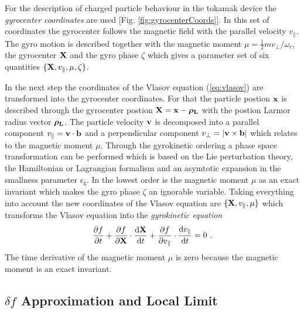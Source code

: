 For the description of charged particle behaviour in the tokamak device the \textit{gyrocenter coordinates} are used [Fig. \ref{fig:gyrocenterCoords}]. In this set of coordinates the gyrocenter follows the magnetic field with the parallel velocity $v_{\parallel}$. The gyro motion is described together with the magnetic moment $\mu = \frac{1}{2}mv_\perp/\omega_\mathrm{c}$, the gyrocenter $\boldsymbol{\mathbf{X}}$ and the gyro phase $\zeta$ which gives a parameter set of six quantities $\{\boldsymbol{\mathbf{X}}, v_{\parallel}, \mu, \zeta\}$.


In the next step the coordinates of the Vlasov equation (\ref{eq:vlasov}) are transformed into the gyrocenter coordinates. For that the particle postion $\boldsymbol{\mathbf{x}}$ is described through the gyrocenter postion $\boldsymbol{\mathbf{X}} = \boldsymbol{\mathbf{x}} - \boldsymbol{\mathbf{\rho_\mathrm{L}}}$ with the postion Larmor radius vector $\boldsymbol{\mathbf{\rho_\mathrm{L}}}$. The particle velocity $\boldsymbol{\mathbf{v}}$ is decomposed into a parallel component $v_\parallel = \boldsymbol{\mathbf{v}} \cdot \boldsymbol{\mathbf{b}}$ and 
a perpendicular component $v_\perp = |\boldsymbol{\mathbf{v}} \times \boldsymbol{\mathbf{b}}|$ which relates to the magnetic moment $\mu$. Through the gyrokinetic ordering a phase space transformation can be performed which is based on the Lie perturbation theory, the Hamiltonian or Lagrangian formalism and an asymtotic expansion in the smallness parameter $\epsilon_\mathrm{g}$. In the lowest order is the magnetic moment $\mu$ as an exact invariant which makes the gyro phase $\zeta$ an ignorable variable. \cite{Garbet2010,Cary1981,Cary1983} Taking everything into account the new coordinates of the Vlasov equation are $\{\boldsymbol{\mathbf{X}}, v_{\parallel}, \mu\}$ which transforms the Vlasov equation into the \textit{gyrokinetic equation}
\begin{gather}
	\frac{\partial f}{\partial t} + \frac{\partial f}{\partial \boldsymbol{\mathbf{X}}} \cdot \frac{\mathrm{d}\boldsymbol{\mathbf{X}}}{\mathrm{d}t} + \frac{\partial f}{\partial v_\parallel} \cdot \frac{\mathrm{d}v_\parallel}{\mathrm{d}t} = 0~.
	\label{eq:gyrokinetic}
\end{gather}
The time derivative of the magnetic moment $\mu$ is zero because the magnetic moment is an exact invariant. 

\subsection{{\boldmath $\delta f$} Approximation and Local Limit}
\label{sub:application}

